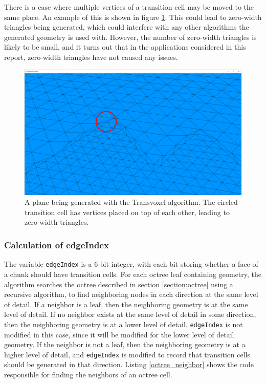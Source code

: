 \documentclass[11pt]{article}
\begin{document}
\begin{enumerate}
There is a case where multiple vertices of a transition cell may be moved to the same place. An example of this is shown in figure \ref{fig:tv_transition_plane}. This could lead to zero-width triangles being generated, which could interfere with any other algorithms the generated geometry is used with. However, the number of zero-width triangles is likely to be small, and it turns out that in the applications considered in this report, zero-width triangles have not caused any issues.

\begin{figure}[H]
  \includegraphics[width=\textwidth]{tv_transition_plane}
  \caption{A plane being generated with the Transvoxel algorithm. The circled transition cell has vertices placed on top of each other, leading to zero-width triangles.}
  \label{fig:tv_transition_plane}
\end{figure}

\end{enumerate}

\subsubsection{Calculation of edgeIndex}
\label{section:edgeIndex}

The variable \texttt{edgeIndex} is a 6-bit integer, with each bit storing whether a face of a chunk should have transition cells. For each octree leaf containing geometry, the algorithm searches the octree described in section \ref{section:octree} using a recursive algorithm, to find neighboring nodes in each direction at the same level of detail. If a neighbor is a leaf, then the neighboring geometry is at the same level of detail. If no neighbor exists at the same level of detail in some direction, then the neighboring geometry is at a lower level of detail. \texttt{edgeIndex} is not modified in this case, since it will be modified for the lower level of detail geometry. If the neighbor is not a leaf, then the neighboring geometry is at a higher level of detail, and \texttt{edgeIndex} is modified to record that transition cells should be generated in that direction. Listing \ref{octree_neighbor} shows the code responsible for finding the neighbors of an octree cell.
\end{document}
